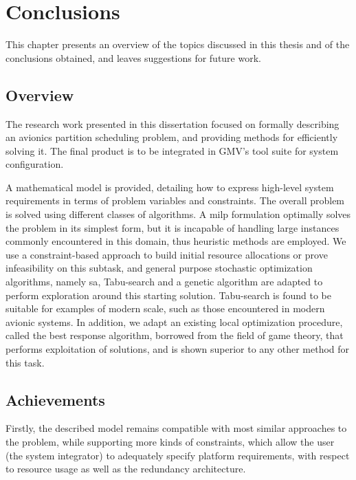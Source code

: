 \documentclass[main.tex]{subfiles}
\begin{document}
\chapter{Conclusions}
\label{sec:conclusion}

This chapter presents an overview of the topics discussed in this thesis and of the conclusions obtained, and leaves suggestions for future work.

\section{Overview}


The research work presented in this dissertation focused on formally describing an avionics partition scheduling problem, and providing methods for efficiently solving it.
The final product is to be integrated in GMV's tool suite for system configuration.

A mathematical model is provided, detailing how to express high-level system requirements in terms of problem variables and constraints.
The overall problem is solved using different classes of algorithms.
A \gls{milp} formulation optimally solves the problem in its simplest form, but it is incapable of handling large instances commonly encountered in this domain, thus heuristic methods are employed.
We use a constraint-based approach to build initial resource allocations or prove infeasibility on this subtask, and general purpose stochastic optimization algorithms, namely \gls{sa}, Tabu-search and a genetic algorithm are adapted to perform exploration around this starting solution.
Tabu-search is found to be suitable for examples of modern scale, such as those encountered in modern avionic systems.
In addition, we adapt an existing local optimization procedure, called the best response algorithm, borrowed from the field of game theory, that performs exploitation of solutions, and is shown superior to any other method for this task.

\section{Achievements}

Firstly, the described model remains compatible with most similar approaches to the problem, while supporting more kinds of constraints, which allow the user (the system integrator) to adequately specify platform requirements, with respect to resource usage as well as the redundancy architecture.
\end{document}
